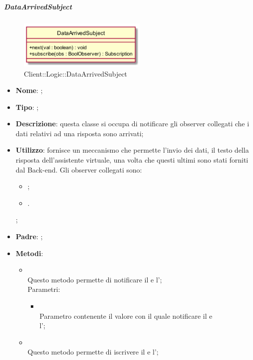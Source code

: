 \hypertarget{DataArrivedSubject_label}{\subparagraph{DataArrivedSubject}}
\begin{figure}[h]
	\centering
	\includegraphics[width=0.55\textwidth,height=\textheight,keepaspectratio]{images/ClassDataArrivedSubject.png}
	\caption{Client::Logic::DataArrivedSubject}
\end{figure}
\begin{itemize}
	\item \textbf{Nome}: ;
	\item \textbf{Tipo}: ;
	\item \textbf{Descrizione}: questa classe si occupa di notificare gli observer collegati che i dati relativi ad una risposta sono arrivati;
	\item \textbf{Utilizzo}: fornisce un meccanismo che permette l'invio dei dati, il testo della risposta dell'assistente virtuale, una volta che questi ultimi sono stati forniti dal Back-end.
	Gli observer collegati sono:
	\begin{itemize}
		\item {};
		\item {}.
	\end{itemize};
	\item \textbf{Padre}: ;
	\item \textbf{Metodi}:
	\begin{itemize}
		\item[]  \\		Questo metodo permette di notificare il  e l';\\
		Parametri:
		\begin{itemize}
			\item {} \\
			Parametro contenente il valore con il quale notificare il  e \\  l';
		\end{itemize}
		\item[]  \\		Questo metodo permette di iscrivere il  e l';\\

\end{itemize}
\end{itemize}
